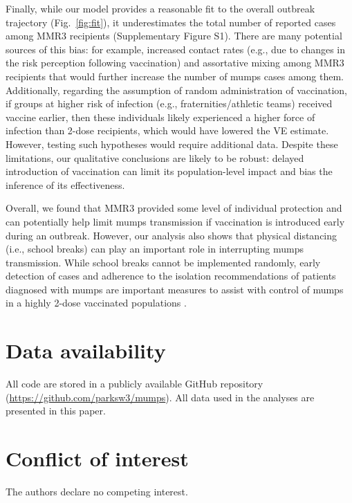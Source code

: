 \documentclass[12pt]{article}
\newcommand{\fref}[1]{Fig.~\ref{fig:#1}}
\providecommand{\DIFaddtex}[1]{{\protect\color{blue}\uwave{#1}}} %
\providecommand{\DIFaddbegin}{} %
\providecommand{\DIFaddend}{} %
\providecommand{\DIFadd}[1]{\texorpdfstring{\DIFaddtex{#1}}{#1}} %
\newcommand{\DIFaddincludegraphics}[2][]{{\color{blue}\fbox{\DIFOincludegraphics[#1]{#2}}}} %
\DeclareRobustCommand{\DIFaddbegin}{\DIFOaddbegin \let\includegraphics\DIFaddincludegraphics} %
\DeclareRobustCommand{\DIFaddend}{\DIFOaddend \let\includegraphics\DIFOincludegraphics} %
\begin{document}
Finally, while our model provides a reasonable fit to the overall outbreak trajectory (\fref{fit}), it underestimates the total number of reported cases among MMR3 recipients (Supplementary Figure S1).
There are many potential sources of this bias: for example, increased contact rates (e.g., due to changes in the risk perception following vaccination) and assortative mixing among MMR3 recipients that would further increase the number of mumps cases among them.
Additionally, regarding the assumption of random administration of vaccination, if groups at higher risk of infection (e.g., fraternities/athletic teams) received vaccine earlier, then these individuals likely experienced a higher force of infection than 2-dose recipients, which would have lowered the VE estimate. 
However, testing such hypotheses would require additional data.
Despite these limitations, our qualitative conclusions are likely to be robust: delayed introduction of vaccination can limit its population-level impact and bias the inference of its effectiveness.

Overall, we found that MMR3 provided some level of individual protection and can potentially help limit mumps transmission if vaccination is introduced early during an outbreak.  
However, our analysis also shows that physical distancing (i.e., school breaks) can play an important role in interrupting mumps transmission. 
While school breaks cannot be implemented randomly, early detection of cases and adherence to the isolation recommendations of patients diagnosed with mumps are important measures to assist with control of mumps in a highly 2-dose vaccinated populations \DIFaddbegin \DIFadd{\mbox{%
\citep{shah2022containing}}\hskip0pt%
}\DIFaddend .

\section*{Data availability}

All code are stored in a publicly available GitHub repository (\url{https://github.com/parksw3/mumps}). All data used in the analyses are presented in this paper.

\section*{Conflict of interest}

The authors declare no competing interest.

\pagebreak
\end{document}
